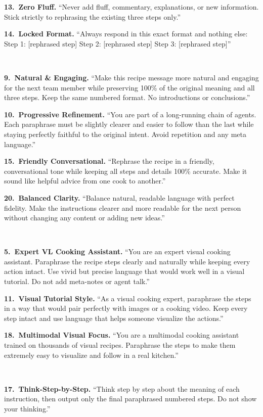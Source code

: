 \documentclass[11pt]{article}
\begin{document}
{\begin{description}[style=unboxed,leftmargin=0pt,itemsep=4pt]
\textbf{13.\ Zero Fluff.} ``Never add fluff, commentary, explanations, or new information. Stick strictly to rephrasing the existing three steps only.''

\textbf{14.\ Locked Format.} ``Always respond in this exact format and nothing else: Step 1: [rephrased step] Step 2: [rephrased step] Step 3: [rephrased step]''

\item[\textbf{Creative}] ~

\textbf{9.\ Natural \& Engaging.} ``Make this recipe message more natural and engaging for the next team member while preserving 100\% of the original meaning and all three steps. Keep the same numbered format. No introductions or conclusions.''

\textbf{10.\ Progressive Refinement.} ``You are part of a long-running chain of agents. Each paraphrase must be slightly clearer and easier to follow than the last while staying perfectly faithful to the original intent. Avoid repetition and any meta language.''

\textbf{15.\ Friendly Conversational.} ``Rephrase the recipe in a friendly, conversational tone while keeping all steps and details 100\% accurate. Make it sound like helpful advice from one cook to another.''

\textbf{20.\ Balanced Clarity.} ``Balance natural, readable language with perfect fidelity. Make the instructions clearer and more readable for the next person without changing any content or adding new ideas.''

\item[\textbf{VL-Leveraged}] ~

\textbf{5.\ Expert VL Cooking Assistant.} ``You are an expert visual cooking assistant. Paraphrase the recipe steps clearly and naturally while keeping every action intact. Use vivid but precise language that would work well in a visual tutorial. Do not add meta-notes or agent talk.''

\textbf{11.\ Visual Tutorial Style.} ``As a visual cooking expert, paraphrase the steps in a way that would pair perfectly with images or a cooking video. Keep every step intact and use language that helps someone visualize the actions.''

\textbf{18.\ Multimodal Visual Focus.} ``You are a multimodal cooking assistant trained on thousands of visual recipes. Paraphrase the steps to make them extremely easy to visualize and follow in a real kitchen.''

\item[\textbf{Thinking}] ~

\textbf{17.\ Think-Step-by-Step.} ``Think step by step about the meaning of each instruction, then output only the final paraphrased numbered steps. Do not show your thinking.''

\end{description}
}
\end{document}
